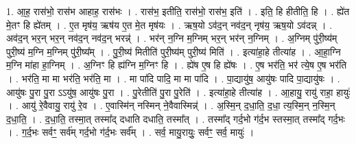 \documentclass[17pt]{extarticle}
\begin{document}
1. आ॒ह॒ रास॑भो॒ रास॑भ आहाह॒ रास॑भः । . रास॑भ॒ इतीति॒ रास॑भो॒ रास॑भ॒ इति॑ । . इति॒ हि हीतीति॒ हि । . ह्ये॑त मे॒तꣳ हि ह्ये॑तम् । . ए॒त मृष॑य॒ ऋष॑य ए॒त मे॒त मृष॑यः । . ऋष॒यो ऽव॑द॒न् नव॑द॒न् नृष॑य॒ ऋष॒यो ऽव॑दन्न् । . अव॑द॒न् भर॒न् भर॒न् नव॑द॒न् नव॑द॒न् भरन्न्॑ । . भर॑न् न॒ग्नि म॒ग्निम् भर॒न् भर॑न् न॒ग्निम् । . अ॒ग्निम् पु॑री॒ष्य॑म् पुरी॒ष्य॑ म॒ग्नि म॒ग्निम् पु॑री॒ष्य᳚म् । . पु॒री॒ष्य॑ मितीति॑ पुरी॒ष्य॑म् पुरी॒ष्य॑ मिति॑ । . इत्या॑हा॒हे तीत्या॑ह । . आ॒हा॒ग्नि म॒ग्नि मा॑हा हा॒ग्निम् । . अ॒ग्निꣳ हि ह्य॑ग्नि म॒ग्निꣳ हि । . ह्ये॑ष ए॒ष हि ह्ये॑षः । . ए॒ष भर॑ति॒ भर॑ त्ये॒ष ए॒ष भर॑ति । . भर॑ति॒ मा मा भर॑ति॒ भर॑ति॒ मा । . मा पा॑दि पादि॒ मा मा पा॑दि । . पा॒द्यायु॑ष॒ आयु॑षः पादि पा॒द्यायु॑षः । . आयु॑षः पु॒रा पु॒रा ऽऽयु॑ष॒ आयु॑षः पु॒रा । . पु॒रेतीति॑ पु॒रा पु॒रेति॑ । . इत्या॑हा॒हे तीत्या॑ह । . आ॒हायु॒ रायु॑ राहा॒ हायुः॑ । . आयु॑ रे॒वैवायु॒ रायु॑ रे॒व । . ए॒वास्मि॑न् नस्मिन् ने॒वैवास्मिन्न्॑ । . अ॒स्मि॒न् द॒धा॒ति॒ द॒धा॒ त्य॒स्मि॒न् न॒स्मि॒न् द॒धा॒ति॒ । . द॒धा॒ति॒ तस्मा॒त् तस्मा᳚द् दधाति दधाति॒ तस्मा᳚त् । . तस्मा᳚द् गर्द॒भो ग॑र्द॒भ स्तस्मा॒त् तस्मा᳚द् गर्द॒भः । . ग॒र्द॒भः सर्वꣳ॒॒ सर्व॑म् गर्द॒भो ग॑र्द॒भः सर्व᳚म् । . सर्व॒ मायु॒रायुः॒ सर्वꣳ॒॒ सर्व॒ मायुः॑ । \newline
\end{document}
